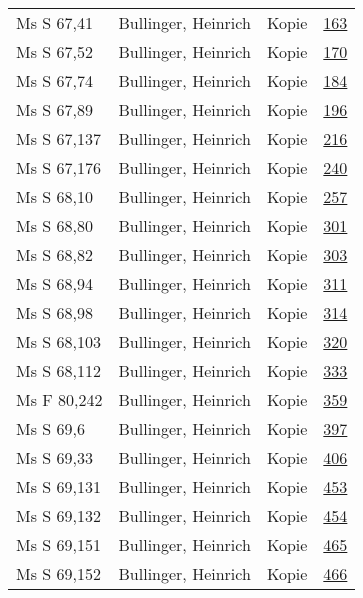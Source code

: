 \documentclass[10pt,a4paper,landscape]{report}
\begin{document}
\begin{longtable}{p{16cm}p{4cm}lr}
Ms S 67,41	&	Bullinger, Heinrich	&	Kopie	&	\href{http://130.60.24.72/assignment/163}{163}\\
Ms S 67,52	&	Bullinger, Heinrich	&	Kopie	&	\href{http://130.60.24.72/assignment/170}{170}\\
Ms S 67,74	&	Bullinger, Heinrich	&	Kopie	&	\href{http://130.60.24.72/assignment/184}{184}\\
Ms S 67,89	&	Bullinger, Heinrich	&	Kopie	&	\href{http://130.60.24.72/assignment/196}{196}\\
Ms S 67,137	&	Bullinger, Heinrich	&	Kopie	&	\href{http://130.60.24.72/assignment/216}{216}\\
Ms S 67,176	&	Bullinger, Heinrich	&	Kopie	&	\href{http://130.60.24.72/assignment/240}{240}\\
Ms S 68,10	&	Bullinger, Heinrich	&	Kopie	&	\href{http://130.60.24.72/assignment/257}{257}\\
Ms S 68,80	&	Bullinger, Heinrich	&	Kopie	&	\href{http://130.60.24.72/assignment/301}{301}\\
Ms S 68,82	&	Bullinger, Heinrich	&	Kopie	&	\href{http://130.60.24.72/assignment/303}{303}\\
Ms S 68,94	&	Bullinger, Heinrich	&	Kopie	&	\href{http://130.60.24.72/assignment/311}{311}\\
Ms S 68,98	&	Bullinger, Heinrich	&	Kopie	&	\href{http://130.60.24.72/assignment/314}{314}\\
Ms S 68,103	&	Bullinger, Heinrich	&	Kopie	&	\href{http://130.60.24.72/assignment/320}{320}\\
Ms S 68,112	&	Bullinger, Heinrich	&	Kopie	&	\href{http://130.60.24.72/assignment/333}{333}\\
Ms F 80,242	&	Bullinger, Heinrich	&	Kopie	&	\href{http://130.60.24.72/assignment/359}{359}\\
Ms S 69,6	&	Bullinger, Heinrich	&	Kopie	&	\href{http://130.60.24.72/assignment/397}{397}\\
Ms S 69,33	&	Bullinger, Heinrich	&	Kopie	&	\href{http://130.60.24.72/assignment/406}{406}\\
Ms S 69,131	&	Bullinger, Heinrich	&	Kopie	&	\href{http://130.60.24.72/assignment/453}{453}\\
Ms S 69,132	&	Bullinger, Heinrich	&	Kopie	&	\href{http://130.60.24.72/assignment/454}{454}\\
Ms S 69,151	&	Bullinger, Heinrich	&	Kopie	&	\href{http://130.60.24.72/assignment/465}{465}\\
Ms S 69,152	&	Bullinger, Heinrich	&	Kopie	&	\href{http://130.60.24.72/assignment/466}{466}\\

\end{longtable}
\end{document}
